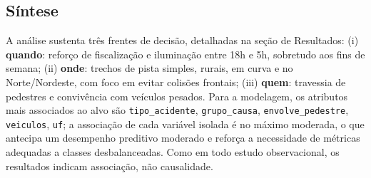 \subsection{Síntese}

\begin{table}[!htbp]
\centering
\small
\caption{Hipóteses testadas e veredito (Holm, $\alpha$ = 0,05, efeito replicado em 2024 e 2025).}\label{tab:hipoteses}
\end{table}

A análise sustenta três frentes de decisão, detalhadas na seção de Resultados: (i) \textbf{quando}: reforço de fiscalização e iluminação entre 18h e 5h, sobretudo aos fins de semana; (ii) \textbf{onde}: trechos de pista simples, rurais, em curva e no Norte/Nordeste, com foco em evitar colisões frontais; (iii) \textbf{quem}: travessia de pedestres e convivência com veículos pesados. Para a modelagem, os atributos mais associados ao alvo são \texttt{tipo\_acidente}, \texttt{grupo\_causa}, \texttt{envolve\_pedestre}, \texttt{veiculos}, \texttt{uf}; a associação de cada variável isolada é no máximo moderada, o que antecipa um desempenho preditivo moderado e reforça a necessidade de métricas adequadas a classes desbalanceadas. Como em todo estudo observacional, os resultados indicam associação, não causalidade.
